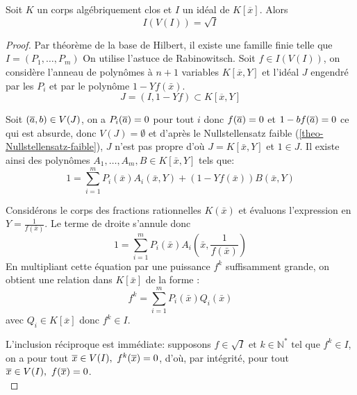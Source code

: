 \begin{theo}[Nullstellensatz]\label{theo-Nullstellensatz}
Soit $K$ un corps algébriquement clos et $I$ un idéal de $K[\overline{x}]$.
Alors \[ I(V(I)) = \sqrt{I} \] 
\end{theo}

\begin{proof}
Par théorème de la base de Hilbert, il existe une famille finie telle que $I = (P_1,\dots,P_m)$
    On utilise l'astuce de Rabinowitsch.
    Soit $f \in I(V(I))$,
    on considère l'anneau de polynômes à $n+1$ variables $K[\overline{x}, Y]$ et
    l'idéal $J$ engendré par les $P_i$ et par le polynôme $1 - Y f(\bar{x})$.
    \[ J = (I, 1 - Y f) \subset K[\overline{x}, Y] \]

    Soit $(\overline{a},b) \in V(J)$, on a $P_i(\overline{a}) = 0$ pour tout $i$ donc
    $f(\overline{a}) = 0$  et $1 - b f(\overline{a}) = 0$ ce
    qui est absurde, donc $V(J) = \emptyset$ et d'après le Nullstellensatz
    faible (\cref{theo-Nullstellensatz-faible}), $J$ n'est pas propre d'où $J = K[\bar{x}, Y]$ et $1 \in J$.
    Il existe ainsi des polynômes $A_1, \dots, A_m, B \in K[\bar{x}, Y]$ tels que:
    \[ 1 = \sum_{i=1}^m P_i(\bar{x}) A_i(\bar{x}, Y) + (1 - Y f(\bar{x})) B(\bar{x}, Y) \]
    
    Considérons le corps des fractions rationnelles $K(\bar{x})$ et évaluons l'expression en $Y = \frac{1}{f(\bar{x})}$.
    Le terme de droite s'annule donc
    \[ 1 = \sum_{i=1}^m P_i(\bar{x}) A_i(\bar{x}, \frac{1}{f(\bar{x})}) \]
    En multipliant cette équation par une puissance $f^k$ suffisamment grande, on obtient une relation dans $K[\bar{x}]$ de la forme :
    \[ f^k = \sum_{i=1}^m P_i(\bar{x}) Q_i(\bar{x}) \]
    avec $Q_i \in K[\overline{x}]$ donc  $f^k \in I$.

L'inclusion réciproque est immédiate: supposons $f \in \sqrt{I} \text{ et } k \in \mathbb{N}^* \text{ tel que } f^k \in I$,
on a pour tout $\overline{x} \in V(I),\text{ }f^k(\overline{x})=0$, d'où, par intégrité, pour tout $\overline{x} \in V(I),\text{ }f(\overline{x})=0$.\\
\end{proof}
